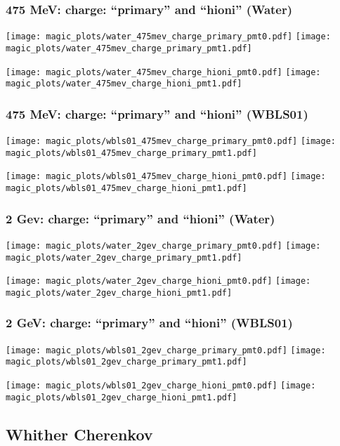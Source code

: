 \documentclass[xcolor=dvipsnames]{beamer}
\begin{document}
\begin{frame}[fragile]
  \frametitle{475 MeV: charge: ``primary'' and ``hioni'' (Water)}

\texttt{[image: magic\_plots/water\_475mev\_charge\_primary\_pmt0.pdf]}%
\texttt{[image: magic\_plots/water\_475mev\_charge\_primary\_pmt1.pdf]}%

\texttt{[image: magic\_plots/water\_475mev\_charge\_hioni\_pmt0.pdf]}%
\texttt{[image: magic\_plots/water\_475mev\_charge\_hioni\_pmt1.pdf]}%
\end{frame}

\begin{frame}[fragile]
  \frametitle{475 MeV: charge: ``primary'' and ``hioni'' (WBLS01)}

\texttt{[image: magic\_plots/wbls01\_475mev\_charge\_primary\_pmt0.pdf]}%
\texttt{[image: magic\_plots/wbls01\_475mev\_charge\_primary\_pmt1.pdf]}%

\texttt{[image: magic\_plots/wbls01\_475mev\_charge\_hioni\_pmt0.pdf]}%
\texttt{[image: magic\_plots/wbls01\_475mev\_charge\_hioni\_pmt1.pdf]}%
\end{frame}

\begin{frame}[fragile]
  \frametitle{2 Gev: charge: ``primary'' and ``hioni'' (Water)}

\texttt{[image: magic\_plots/water\_2gev\_charge\_primary\_pmt0.pdf]}%
\texttt{[image: magic\_plots/water\_2gev\_charge\_primary\_pmt1.pdf]}%

\texttt{[image: magic\_plots/water\_2gev\_charge\_hioni\_pmt0.pdf]}%
\texttt{[image: magic\_plots/water\_2gev\_charge\_hioni\_pmt1.pdf]}%
\end{frame}
\begin{frame}[fragile]
  \frametitle{2 GeV: charge: ``primary'' and ``hioni'' (WBLS01)}

\texttt{[image: magic\_plots/wbls01\_2gev\_charge\_primary\_pmt0.pdf]}%
\texttt{[image: magic\_plots/wbls01\_2gev\_charge\_primary\_pmt1.pdf]}%

\texttt{[image: magic\_plots/wbls01\_2gev\_charge\_hioni\_pmt0.pdf]}%
\texttt{[image: magic\_plots/wbls01\_2gev\_charge\_hioni\_pmt1.pdf]}%
\end{frame}

\subsection {Whither Cherenkov}
\end{document}

